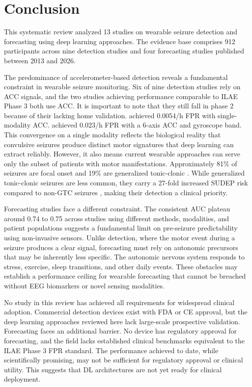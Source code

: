\section{Conclusion}
\label{sec:conclusion}

This systematic review analyzed 13 studies on wearable seizure detection and forecasting using deep learning approaches. The evidence base comprises 912 participants across nine detection studies and four forecasting studies published between 2013 and 2026.

The predominance of accelerometer-based detection reveals a fundamental constraint in wearable seizure monitoring. Six of nine detection studies rely on ACC signals, and the two studies achieving performance comparable to ILAE Phase 3 both use ACC. It is important to note that they still fall in phase 2 because of their lacking home validation. \textcite{spahrDeepLearningbasedDetection2025} achieved 0.0054/h FPR with single-modality ACC. \textcite{fineDetectionKeyAutomated2025} achieved 0.023/h FPR with a 6-axis ACC and gyroscope band. This convergence on a single modality reflects the biological reality that convulsive seizures produce distinct motor signatures that deep learning can extract reliably. However, it also means current wearable approaches can serve only the subset of patients with motor manifestations. Approximately 81\% of seizures are focal onset and 19\% are generalized tonic-clonic \parencite{ayubNaturalHistoryGeneralized2020}. While generalized tonic-clonic seizures are less common, they carry a 27-fold increased SUDEP risk compared to non-GTC seizures \parencite{sveinssonClinicalRiskFactors2020}, making their detection a clinical priority.

Forecasting studies face a different constraint. The consistent AUC plateau around 0.74 to 0.75 across studies using different methods, modalities, and patient populations suggests a fundamental limit on pre-seizure predictability using non-invasive sensors. Unlike detection, where the motor event during a seizure produces a clear signal, forecasting must rely on autonomic precursors that may be inherently less specific. The autonomic nervous system responds to stress, exercise, sleep transitions, and other daily events. These obstacles may establish a performance ceiling for wearable forecasting that cannot be breached without EEG biomarkers or novel sensing modalities.

No study in this review has achieved all requirements for widespread clinical adoption. Commercial detection devices exist with FDA or CE approval, but the deep learning approaches reviewed here lack large-scale prospective validation. Forecasting faces an additional barrier. No device has regulatory approval for forecasting, and the field lacks established clinical benchmarks equivalent to the ILAE Phase 3 FPR standard. The performance achieved to date, while scientifically promising, may not be sufficient for regulatory approval or clinical utility. This suggests that DL architectures are not yet ready for clinical deployment.

